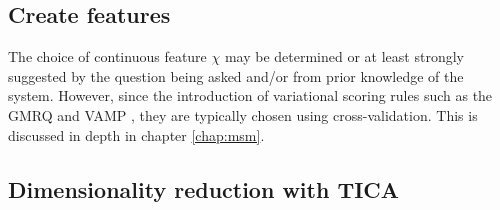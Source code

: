\subsection{Create features}
The choice of continuous feature $\chi$ may be determined or at least strongly suggested by the question being asked and/or from prior knowledge of the system. However, since the introduction of variational scoring rules such as the GMRQ \cite{mcgibbonVariationalCrossvalidationSlow2015} and VAMP \cite{wuVariationalApproachLearning2020c}, they are typically chosen using cross-validation. This is discussed in depth in chapter \ref{chap:msm}. 

\subsection{Dimensionality reduction with TICA}

